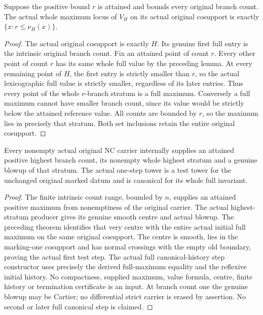 \begin{theorem}
\label{hir:general-nc-initial-whole-full-maximum}
\leanok
{}
Suppose the positive bound $r$ is attained and bounds every original
branch count. The actual whole maximum locus of $V_H$ on its actual
original cosupport is exactly $\{x:r\leq\nu_H(x)\}$.
\end{theorem}
\begin{proof}
The actual original cosupport is exactly $H$. Its genuine first full
entry is the intrinsic original branch count. Fix an attained point
of count $r$. Every other point of count $r$ has its same whole full
value by the preceding lemma. At every remaining point of $H$, the
first entry is strictly smaller than $r$, so the actual lexicographic
full value is strictly smaller, regardless of its later entries.
Thus every point of the whole $r$-branch stratum is a full maximum.
Conversely a full maximum cannot have smaller branch count, since its
value would be strictly below the attained reference value. All counts
are bounded by $r$, so the maximum lies in precisely that stratum.
Both set inclusions retain the entire original cosupport.
\end{proof}

\begin{theorem}
\label{hir:general-nc-original-first-full-canonical-blowup}
\leanok
{}
Every nonempty actual original NC carrier internally supplies an attained
positive highest branch count, its nonempty whole highest stratum and
a genuine blowup of that stratum. The actual one-step tower is a test
tower for the unchanged original marked datum and is canonical for its
whole full invariant.
\end{theorem}
\begin{proof}
The finite intrinsic count range, bounded by $n$, supplies an attained
positive maximum from nonemptiness of the original carrier. The actual
highest-stratum producer gives its genuine smooth centre and actual
blowup. The preceding theorem identifies that very centre with the
entire actual initial full maximum on the same original cosupport.
The centre is smooth, lies in the marking-one cosupport and has normal
crossings with the empty old boundary, proving the actual first test
step. The actual full canonical-history step constructor uses precisely
the derived full-maximum equality and the reflexive initial history.
No compactness, supplied maximum, value formula, centre, finite history
or termination certificate is an input. At branch count one the
genuine blowup may be Cartier; no differential strict carrier is erased
by assertion. No second or later full canonical step is claimed.
\end{proof}
